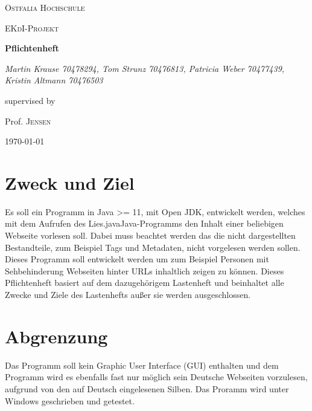 \documentclass[12pt]{scrartcl}
\begin{document}
\begin{titlepage}
	\centering
	{\scshape\LARGE Ostfalia Hochschule \par}
	\vspace{1cm}
	{\scshape\Large EKdI-Projekt\par}
	\vspace{1.5cm}
	{\huge\bfseries Pflichtenheft\par}
	\vspace{2cm}
	{\Large\itshape Martin Krause 70478294, Tom Strunz 70476813, Patricia Weber 70477439, Kristin Altmann 70476503\par}
	\vfill
	supervised by\par
	Prof. \textsc{Jensen}

	\vfill

	{\large \today\par}
\end{titlepage}


\tableofcontents
\newpage


\section{Zweck und Ziel}
Es soll ein Programm in Java >= 11, mit Open JDK, entwickelt werden, welches mit dem Aufrufen des \glqq Lies.java\grqq Java-Programms den Inhalt einer beliebigen Webseite vorlesen soll. Dabei muss beachtet werden das die nicht dargestellten Bestandteile, zum Beispiel Tags und Metadaten, nicht vorgelesen werden sollen. Dieses Programm soll entwickelt werden um zum Beispiel Personen mit Sehbehinderung Webseiten hinter URLs inhaltlich zeigen zu können. Dieses Pflichtenheft basiert auf dem dazugehörigem Lastenheft und beinhaltet alle Zwecke und Ziele des Lastenhefts außer sie werden ausgeschlossen.

\section{Abgrenzung}
Das Programm soll kein Graphic User Interface (GUI) enthalten und dem Programm wird es ebenfalls fast nur möglich sein Deutsche Webseiten vorzulesen, aufgrund von den auf Deutsch eingelesenen Silben. Das Proramm wird unter Windows geschrieben und getestet.
\end{document}

